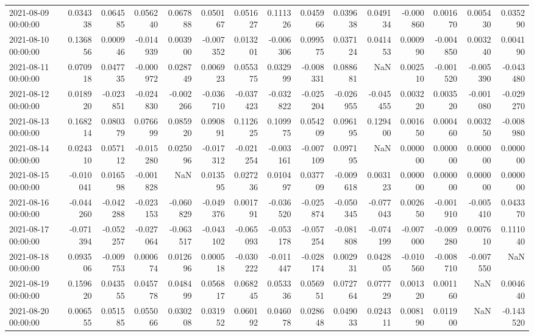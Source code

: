 \begin{tabular}{lrrrrrrrrrrrrrr}
2021-08-09 00:00:00 & 0.034338 & 0.064585 & 0.056240 & 0.067888 & 0.050167 & 0.051627 & 0.111326 & 0.045966 & 0.039638 & 0.049134 & -0.000860 & 0.001670 & 0.005430 & 0.035290 \\
2021-08-10 00:00:00 & 0.136856 & 0.000946 & -0.014939 & 0.003900 & -0.007352 & 0.013201 & -0.006306 & 0.099575 & 0.037124 & 0.041453 & 0.000990 & -0.004850 & 0.003240 & 0.004190 \\
2021-08-11 00:00:00 & 0.070918 & 0.047735 & -0.000972 & 0.028749 & 0.006923 & 0.055375 & 0.032999 & -0.008331 & 0.088681 & NaN & 0.002510 & -0.001520 & -0.005390 & -0.043480 \\
2021-08-12 00:00:00 & 0.018920 & -0.023851 & -0.024830 & -0.002266 & -0.036710 & -0.037423 & -0.032822 & -0.025204 & -0.026955 & -0.045455 & 0.003220 & 0.003520 & -0.001080 & -0.029270 \\
2021-08-13 00:00:00 & 0.168214 & 0.080379 & 0.076699 & 0.085920 & 0.090891 & 0.112625 & 0.109975 & 0.054209 & 0.096195 & 0.129400 & 0.001650 & 0.000460 & 0.003250 & -0.008980 \\
2021-08-14 00:00:00 & 0.024310 & 0.057112 & -0.015280 & 0.025096 & -0.017312 & -0.021254 & -0.003161 & -0.007109 & 0.097195 & NaN & 0.000000 & 0.000000 & 0.000000 & 0.000000 \\
2021-08-15 00:00:00 & -0.010041 & 0.016598 & -0.001828 & NaN & 0.013595 & 0.027236 & 0.010497 & 0.037709 & -0.009618 & 0.003123 & 0.000000 & 0.000000 & 0.000000 & 0.000000 \\
2021-08-16 00:00:00 & -0.044260 & -0.042288 & -0.023153 & -0.060829 & -0.049376 & 0.001791 & -0.036520 & -0.025874 & -0.050345 & -0.077043 & 0.002650 & -0.001910 & -0.005410 & 0.043370 \\
2021-08-17 00:00:00 & -0.071394 & -0.052257 & -0.027064 & -0.063517 & -0.043102 & -0.065093 & -0.053178 & -0.057254 & -0.081808 & -0.074199 & -0.007000 & -0.009280 & 0.007610 & 0.111040 \\
2021-08-18 00:00:00 & 0.093506 & -0.009753 & 0.000674 & 0.012696 & 0.000518 & -0.030222 & -0.011447 & -0.028174 & 0.002931 & 0.042805 & -0.010560 & -0.008710 & -0.007550 & NaN \\
2021-08-19 00:00:00 & 0.159620 & 0.043555 & 0.045778 & 0.048499 & 0.056817 & 0.068245 & 0.053336 & 0.056951 & 0.072764 & 0.077729 & 0.001320 & 0.001160 & NaN & 0.004640 \\
2021-08-20 00:00:00 & 0.006555 & 0.051585 & 0.055066 & 0.030208 & 0.031952 & 0.060192 & 0.046078 & 0.028648 & 0.049033 & 0.024311 & 0.008190 & 0.011900 & NaN & -0.143520 \\

\end{tabular}
